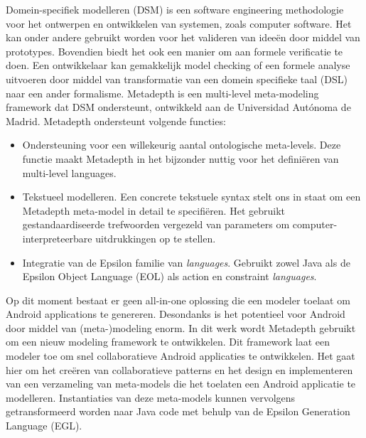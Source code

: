 Domein-specifiek modelleren (DSM) is een software engineering methodologie voor het ontwerpen en ontwikkelen van systemen, zoals computer software. Het kan onder andere gebruikt worden voor het valideren van idee\"en door middel van prototypes. Bovendien biedt het ook een manier om aan formele verificatie te doen. Een ontwikkelaar kan gemakkelijk model checking of een formele analyse uitvoeren door middel van transformatie van een domein specifieke taal (DSL) naar een ander formalisme. Metadepth is een multi-level meta-modeling framework dat DSM ondersteunt, ontwikkeld aan de Universidad Aut\'onoma de Madrid. Metadepth ondersteunt volgende functies:
\begin{itemize}
\item{Ondersteuning voor een willekeurig aantal ontologische meta-levels. Deze functie maakt Metadepth in het bijzonder nuttig voor het defini\"eren van multi-level languages.}
\item{Tekstueel modelleren. Een concrete tekstuele syntax stelt ons in staat om een Metadepth meta-model in detail te specifi\"eren. Het gebruikt gestandaardiseerde trefwoorden vergezeld van parameters om computer-interpreteerbare uitdrukkingen op te stellen.}
\item{Integratie van de Epsilon familie van \textit{languages}. Gebruikt zowel Java als de Epsilon Object Language (EOL) als action en constraint \textit{languages}.}
\end{itemize}
Op dit moment bestaat er geen all-in-one oplossing die een modeler toelaat om Android applications te genereren. Desondanks is het potentieel voor Android door middel van (meta-)modeling enorm. In dit werk wordt Metadepth gebruikt om een nieuw modeling framework te ontwikkelen. Dit framework laat een modeler toe om snel collaboratieve Android applicaties te ontwikkelen. Het gaat hier om het cre\"eren van collaboratieve patterns en het design en implementeren van een verzameling van meta-models die het toelaten een Android applicatie te modelleren. Instantiaties van deze meta-models kunnen vervolgens getransformeerd worden naar Java code met behulp van de Epsilon Generation Language (EGL).
